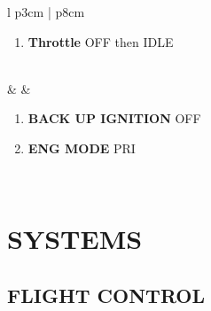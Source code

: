 \documentclass[10pt,usenames,dvipsnames,twoside]{report}
\begin{document}
\begin{center}
\begin{longtable}{l p{3cm} | p{8cm}}
\begin{minipage}[t]{\linewidth}
\begin{enumerate}[label=(\alph*), resume]
					\item \textbf{Throttle} \dotfill OFF then IDLE
				\end{enumerate}
			\end{minipage} \\
			\midrule
			\textbullet &  &
			\begin{minipage}[t]{\linewidth}
				\vspace{-7pt}
				\begin{enumerate}
					\item \textbf{BACK UP IGNITION} \dotfill OFF
					\item \textbf{ENG MODE} \dotfill PRI
				\end{enumerate}
			\end{minipage} \\
			\bottomrule
		\end{longtable}
	\end{center}

	\cleardoublepage

	\chapter{SYSTEMS}
	\minitoc
	\cleardoublepage

	\section{FLIGHT CONTROL}
	\thumbnar
\end{document}

